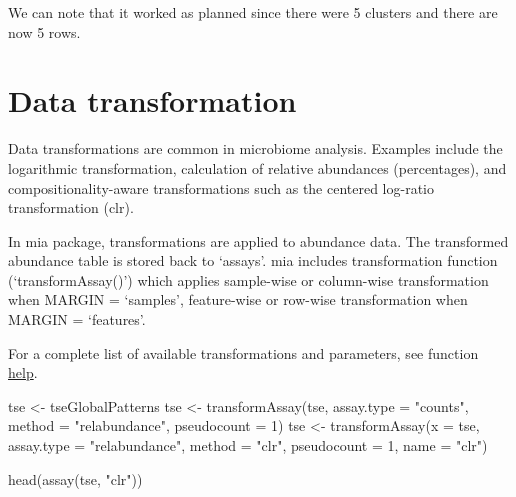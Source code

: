 \documentclass[
]{book}
\newenvironment{Shaded}{\begin{snugshade}}{\end{snugshade}}
\newcommand{\AttributeTok}[1]{\textcolor[rgb]{0.77,0.63,0.00}{#1}}
\newcommand{\DecValTok}[1]{\textcolor[rgb]{0.00,0.00,0.81}{#1}}
\newcommand{\FunctionTok}[1]{\textcolor[rgb]{0.00,0.00,0.00}{#1}}
\newcommand{\NormalTok}[1]{#1}
\newcommand{\OtherTok}[1]{\textcolor[rgb]{0.56,0.35,0.01}{#1}}
\newcommand{\StringTok}[1]{\textcolor[rgb]{0.31,0.60,0.02}{#1}}
\begin{document}
We can note that it worked as planned since there were 5 clusters and there are
now 5 rows.

\hypertarget{assay-transform}{%
\section{Data transformation}\label{assay-transform}}

Data transformations are common in microbiome analysis. Examples
include the logarithmic transformation, calculation of relative
abundances (percentages), and compositionality-aware transformations
such as the centered log-ratio transformation (clr).

In mia package, transformations are applied to abundance data. The transformed
abundance table is stored back to `assays'. mia includes transformation
function (`transformAssay()') which applies sample-wise or column-wise
transformation when MARGIN = `samples', feature-wise or row-wise transformation
when MARGIN = `features'.

For a complete list of available transformations and parameters, see function
\href{https://microbiome.github.io/mia/reference/transformAssay.html}{help}.

\begin{Shaded}
\begin{Highlighting}[]
\NormalTok{tse }\OtherTok{\textless{}{-}}\NormalTok{ tseGlobalPatterns}
\NormalTok{tse }\OtherTok{\textless{}{-}} \FunctionTok{transformAssay}\NormalTok{(tse, }\AttributeTok{assay.type =} \StringTok{"counts"}\NormalTok{, }\AttributeTok{method =} \StringTok{"relabundance"}\NormalTok{, }\AttributeTok{pseudocount =} \DecValTok{1}\NormalTok{)}
\NormalTok{tse }\OtherTok{\textless{}{-}} \FunctionTok{transformAssay}\NormalTok{(}\AttributeTok{x =}\NormalTok{ tse, }\AttributeTok{assay.type =} \StringTok{"relabundance"}\NormalTok{, }\AttributeTok{method =} \StringTok{"clr"}\NormalTok{, }
                      \AttributeTok{pseudocount =} \DecValTok{1}\NormalTok{, }\AttributeTok{name =} \StringTok{"clr"}\NormalTok{)}

\FunctionTok{head}\NormalTok{(}\FunctionTok{assay}\NormalTok{(tse, }\StringTok{"clr"}\NormalTok{))}
\end{Highlighting}
\end{Shaded}
\end{document}

